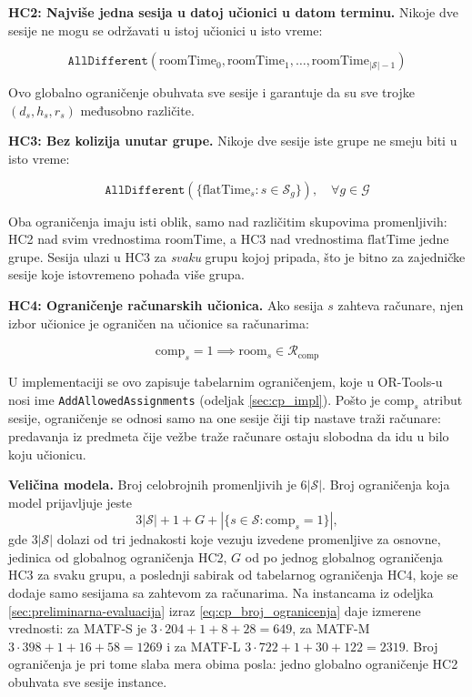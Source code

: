 \documentclass[12pt,oneside]{memoir}
\begin{document}
\medskip
\textbf{HC2: Najviše jedna sesija u datoj učionici u datom terminu.}
Nikoje dve sesije ne mogu se održavati u istoj učionici u isto vreme:

\begin{equation}
\texttt{AllDifferent}(\text{roomTime}_0, \text{roomTime}_1,
  \ldots, \text{roomTime}_{|\mathcal{S}|-1})
\label{eq:cp_hc2}
\end{equation}

Ovo globalno ograničenje obuhvata sve sesije i garantuje
da su sve trojke $(d_s, h_s, r_s)$ međusobno različite.

\medskip
\textbf{HC3: Bez kolizija unutar grupe.}
Nikoje dve sesije iste grupe ne smeju biti u isto vreme:

\begin{equation}
\texttt{AllDifferent}(\{\text{flatTime}_s : s \in \mathcal{S}_g\}),
  \quad \forall g \in \mathcal{G}
\label{eq:cp_hc3}
\end{equation}

Oba ograničenja imaju isti oblik, samo nad različitim skupovima
promenljivih: HC2 nad svim vrednostima $\text{roomTime}$, a HC3 nad
vrednostima $\text{flatTime}$ jedne grupe. Sesija ulazi u HC3 za
\emph{svaku} grupu kojoj pripada, što je bitno za zajedničke sesije
koje istovremeno pohađa više grupa.

\medskip
\textbf{HC4: Ograničenje računarskih učionica.}
Ako sesija $s$ zahteva računare, njen izbor učionice je ograničen na
učionice sa računarima:

\begin{equation}
\text{comp}_s = 1 \implies \text{room}_s \in \mathcal{R}_{\text{comp}}
\label{eq:cp_hc4}
\end{equation}

U implementaciji se ovo zapisuje tabelarnim ograničenjem, koje u
OR-Tools-u nosi ime \texttt{AddAllowedAssignments} (odeljak
\ref{sec:cp_impl}). Pošto je $\text{comp}_s$ atribut sesije,
ograničenje se odnosi samo na one sesije čiji tip nastave traži
računare: predavanja iz predmeta čije vežbe traže računare ostaju
slobodna da idu u bilo koju učionicu.

\medskip
\textbf{Veličina modela.} Broj celobrojnih promenljivih je
$6|\mathcal{S}|$. Broj ograničenja koja model prijavljuje jeste
\begin{equation}
3|\mathcal{S}| + 1 + G + |\{s \in \mathcal{S} : \text{comp}_s = 1\}|,
\label{eq:cp_broj_ogranicenja}
\end{equation}
gde $3|\mathcal{S}|$ dolazi od tri jednakosti koje vezuju izvedene
promenljive za osnovne, jedinica od globalnog ograničenja HC2, $G$ od
po jednog globalnog ograničenja HC3 za svaku grupu, a poslednji sabirak
od tabelarnog ograničenja HC4, koje se dodaje samo sesijama sa
zahtevom za računarima. Na instancama iz odeljka
\ref{sec:preliminarna-evaluacija} izraz \eqref{eq:cp_broj_ogranicenja}
daje izmerene vrednosti: za MATF-S je
$3 \cdot 204 + 1 + 8 + 28 = 649$, za MATF-M
$3 \cdot 398 + 1 + 16 + 58 = 1269$ i za MATF-L
$3 \cdot 722 + 1 + 30 + 122 = 2319$. Broj ograničenja je pri tome slaba
mera obima posla: jedno globalno ograničenje HC2 obuhvata sve sesije
instance.
\end{document}
